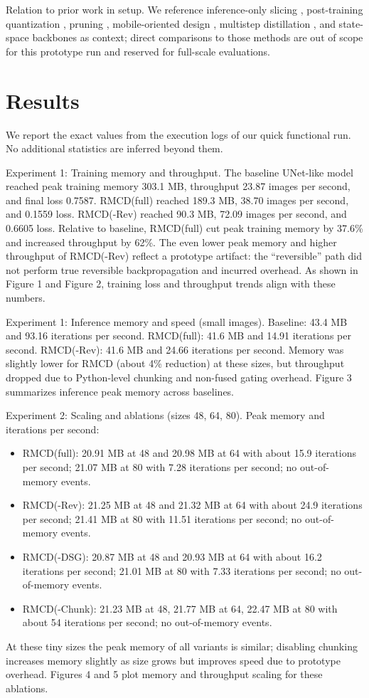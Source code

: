 \documentclass{article}
\begin{document}
Relation to prior work in setup. We reference inference-only slicing \cite{zhan-2024-fast}, post-training quantization \cite{shang-2022-post}, pruning \cite{fang-2023-structural}, mobile-oriented design \cite{li-2023-snapfusion}, multistep distillation \cite{salimans-2024-multistep}, and state-space backbones \cite{yan-2023-diffusion} as context; direct comparisons to those methods are out of scope for this prototype run and reserved for full-scale evaluations.

\section{Results}
We report the exact values from the execution logs of our quick functional run. No additional statistics are inferred beyond them.

Experiment 1: Training memory and throughput. The baseline UNet-like model reached peak training memory 303.1 MB, throughput 23.87 images per second, and final loss 0.7587. RMCD(full) reached 189.3 MB, 38.70 images per second, and 0.1559 loss. RMCD(-Rev) reached 90.3 MB, 72.09 images per second, and 0.6605 loss. Relative to baseline, RMCD(full) cut peak training memory by 37.6\% and increased throughput by 62\%. The even lower peak memory and higher throughput of RMCD(-Rev) reflect a prototype artifact: the ``reversible'' path did not perform true reversible backpropagation and incurred overhead. As shown in Figure 1 and Figure 2, training loss and throughput trends align with these numbers.

Experiment 1: Inference memory and speed (small images). Baseline: 43.4 MB and 93.16 iterations per second. RMCD(full): 41.6 MB and 14.91 iterations per second. RMCD(-Rev): 41.6 MB and 24.66 iterations per second. Memory was slightly lower for RMCD (about 4\% reduction) at these sizes, but throughput dropped due to Python-level chunking and non-fused gating overhead. Figure 3 summarizes inference peak memory across baselines.

Experiment 2: Scaling and ablations (sizes 48, 64, 80). Peak memory and iterations per second:
\begin{itemize}
\item RMCD(full): 20.91 MB at 48 and 20.98 MB at 64 with about 15.9 iterations per second; 21.07 MB at 80 with 7.28 iterations per second; no out-of-memory events.
\item RMCD(-Rev): 21.25 MB at 48 and 21.32 MB at 64 with about 24.9 iterations per second; 21.41 MB at 80 with 11.51 iterations per second; no out-of-memory events.
\item RMCD(-DSG): 20.87 MB at 48 and 20.93 MB at 64 with about 16.2 iterations per second; 21.01 MB at 80 with 7.33 iterations per second; no out-of-memory events.
\item RMCD(-Chunk): 21.23 MB at 48, 21.77 MB at 64, 22.47 MB at 80 with about 54 iterations per second; no out-of-memory events.
\end{itemize}
At these tiny sizes the peak memory of all variants is similar; disabling chunking increases memory slightly as size grows but improves speed due to prototype overhead. Figures 4 and 5 plot memory and throughput scaling for these ablations.
\end{document}
